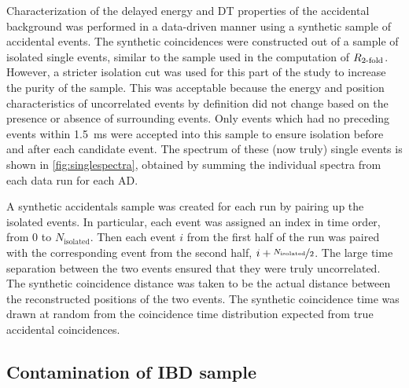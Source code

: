 Characterization of the delayed energy and DT properties
of the accidental background
was performed in a data-driven manner using
a synthetic sample of accidental events.
The synthetic coincidences were constructed out of a sample of isolated single events,
similar to the sample used in the computation of $R_\text{\ensuremath{2}-fold}$.
However, a stricter isolation cut was used for this part of the study
to increase the purity of the sample.
This was acceptable because the energy and position characteristics of uncorrelated events
by definition did not change based on the presence or absence
of surrounding events.
Only  events which had no preceding events within \SI{1.5}{\ms}
were accepted into this sample
to ensure isolation before and after each candidate event.
The spectrum of these (now truly) single events is shown in \cref{fig:singlespectra},
obtained by summing the individual spectra from each data run for each AD.


A synthetic accidentals sample was created for each run
by pairing up the isolated events.
In particular, each event was assigned an index in time order,
from $0$ to $N_{\text{isolated}}$.
Then each event $i$ from the first half of the run was paired with
the corresponding event from the second half, $i + \nicefrac{N_{\text{isolated}}}{2}$.
The large time separation between the two events
ensured that they were truly uncorrelated.
The synthetic coincidence distance was taken to be the actual distance
between the reconstructed positions of the two events.
The synthetic coincidence time was drawn at random
from the coincidence time distribution
expected from true accidental coincidences.

\subsection{Contamination of IBD sample}
\label{subsec:acc_count}

